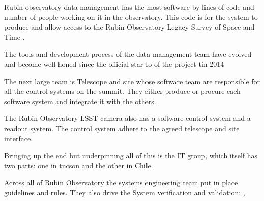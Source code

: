 Rubin observatory  data management \citep{2015arXiv151207914J} has the most software by lines of code and number of people working on it in the observatory. This code is for the system to produce and allow access to the Rubin Observatory Legacy Survey of Space and Time \cite{LSE-163}.

The tools and development process of the data management team have evolved and become well honed since the official star to of the project tin 2014 \citep{2018SPIE10707E..09J}

The next large team is  Telescope and site  \citep{2014SPIE.9145E..1AG} whose software team are responsible for all the control systems on the summit. They either produce or procure each software system and integrate it with the others.

The Rubin Observatory LSST camera \citep{2010SPIE.7735E..0JK} also has a software control system and a readout system. The control system adhere to the agreed telescope and site interface.

 Bringing up the end but underpinning all of this is the IT group, which itself has two parts: one in tucson and the other in Chile.

 Across all of Rubin Observatory the systems engineering team \citep{2014SPIE.9150E..0MC} put in place guidelines and rules. They also drive the  System verification and validation: \citep{2014SPIE.9150E..0NS},



